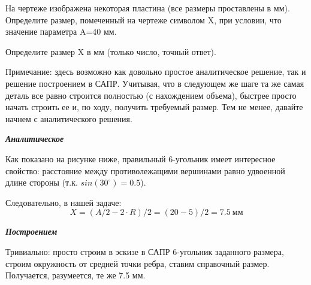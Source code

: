 
На чертеже изображена некоторая пластина (все размеры проставлены в мм).  
Определите размер, помеченный на чертеже символом X, при условии, что значение параметра A=40 мм.


Определите размер X в мм (только число, точный ответ).

Примечание: здесь возможно как довольно простое аналитическое решение, так и решение построением в САПР.  Учитывая, что в следующем же шаге та же самая деталь все равно строится полностью (с нахождением объема), быстрее просто начать строить ее и, по ходу, получить требуемый размер. Тем не менее, давайте начнем с аналитического решения.

\solutionSection

\textit{\textbf{Аналитическое}}

Как показано на рисунке ниже, правильный 6-угольник имеет интересное свойство: расстояние между противолежащими вершинами равно удвоенной длине стороны (т.к. $sin(30^\circ) = 0.5$).


Следовательно, в нашей задаче:
$$X = (A/2 - 2 \cdot R) / 2  =  (20 - 5) / 2 = 7.5 \: \text{мм}$$


\textit{\textbf{Построением}}

Тривиально: просто строим в эскизе в САПР 6-угольник заданного размера, строим окружность от средней точки ребра, ставим справочный размер. Получается, разумеется, те же 7.5 мм.


